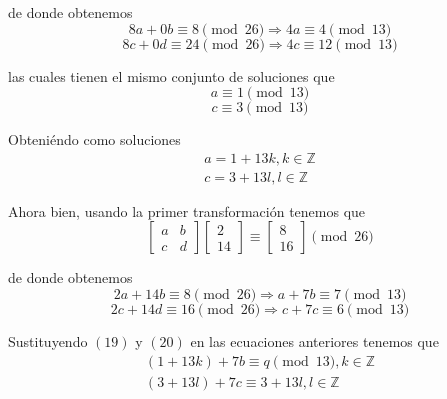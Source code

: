 \documentclass[letterpaper,10pt]{article}
\begin{document}
\begin{enumerate}
\begin{enumerate}
        de donde obtenemos
        \begin{equation*}
            8a + 0b \equiv 8 \pmod{26} \Rightarrow 4a \equiv 4 \pmod{13}
        \end{equation*}
        \begin{equation*}
            8c + 0d \equiv 24 \pmod{26} \Rightarrow 4c \equiv 12 \pmod{13}
        \end{equation*}

        las cuales tienen el mismo conjunto de soluciones que
        \begin{equation*}
            a \equiv 1 \pmod{13}
        \end{equation*}
        \begin{equation*}
            c \equiv 3 \pmod{13}
        \end{equation*}
        
        Obteniéndo como soluciones
        \begin{align}
            a = 1 + 13k, k \in \mathbb{Z} \\
            c = 3 + 13l, l \in \mathbb{Z}
        \end{align}
        
        Ahora bien, usando la primer transformación tenemos que 
        \begin{equation*}
            \begin{bmatrix} a & b \\ c & d \end{bmatrix}
            \begin{bmatrix} 2 \\ 14 \end{bmatrix} \equiv
            \begin{bmatrix} 8 \\ 16 \end{bmatrix} \pmod{26}
        \end{equation*}
        
        de donde obtenemos
        \begin{equation*}
            2a + 14b \equiv 8 \pmod{26} \Rightarrow a + 7b \equiv 7 \pmod{13}
        \end{equation*}
        \begin{equation*}
            2c + 14d \equiv 16 \pmod{26} \Rightarrow c + 7c \equiv 6 \pmod{13}
        \end{equation*}

        Sustituyendo $(19)$ y $(20)$ en las ecuaciones anteriores tenemos que 
        \begin{align*}
            (1 + 13k) + 7b \equiv q \pmod{13}, k \in \mathbb{Z} \\
            (3 + 13l) + 7c \equiv 3 + 13l, l \in \mathbb{Z}
        \end{align*}
        

\end{enumerate}
\end{enumerate}
\end{document}
